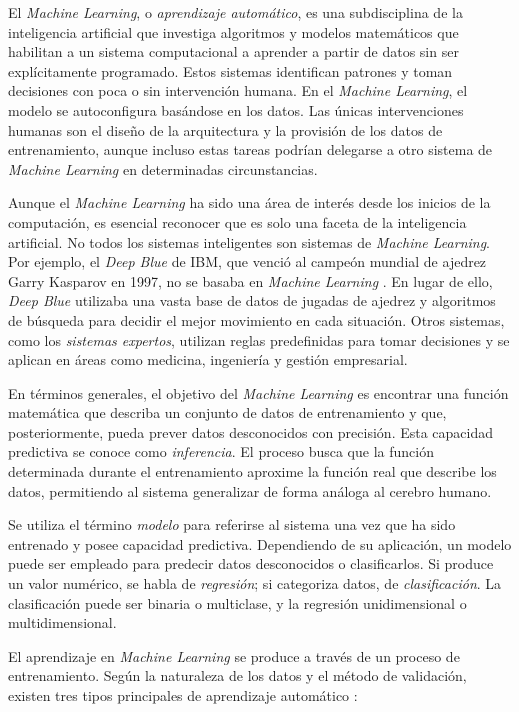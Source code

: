 El \textit{Machine Learning}, o \textit{aprendizaje automático}, es una subdisciplina de la inteligencia artificial que investiga algoritmos y modelos matemáticos que habilitan a un sistema computacional a aprender a partir de datos sin ser explícitamente programado. Estos sistemas identifican patrones y toman decisiones con poca o sin intervención humana. En el \textit{Machine Learning}, el modelo se autoconfigura basándose en los datos. Las únicas intervenciones humanas son el diseño de la arquitectura y la provisión de los datos de entrenamiento, aunque incluso estas tareas podrían delegarse a otro sistema de \textit{Machine Learning} en determinadas circunstancias.

Aunque el \textit{Machine Learning} ha sido una área de interés desde los inicios de la computación, es esencial reconocer que es solo una faceta de la inteligencia artificial. No todos los sistemas inteligentes son sistemas de \textit{Machine Learning}. Por ejemplo, el \textit{Deep Blue} de IBM, que venció al campeón mundial de ajedrez Garry Kasparov en 1997, no se basaba en \textit{Machine Learning} \citep{campbellDeepBlue2002}. En lugar de ello, \textit{Deep Blue} utilizaba una vasta base de datos de jugadas de ajedrez y algoritmos de búsqueda para decidir el mejor movimiento en cada situación. Otros sistemas, como los \emph{sistemas expertos}, utilizan reglas predefinidas para tomar decisiones y se aplican en áreas como medicina, ingeniería y gestión empresarial.

En términos generales, el objetivo del \textit{Machine Learning} es encontrar una función matemática que describa un conjunto de datos de entrenamiento y que, posteriormente, pueda prever datos desconocidos con precisión. Esta capacidad predictiva se conoce como \textit{inferencia}. El proceso busca que la función determinada durante el entrenamiento aproxime la función real que describe los datos, permitiendo al sistema generalizar de forma análoga al cerebro humano.

Se utiliza el término \textit{modelo} para referirse al sistema una vez que ha sido entrenado y posee capacidad predictiva. Dependiendo de su aplicación, un modelo puede ser empleado para predecir datos desconocidos o clasificarlos. Si produce un valor numérico, se habla de \textit{regresión}; si categoriza datos, de \textit{clasificación}. La clasificación puede ser binaria o multiclase, y la regresión unidimensional o multidimensional.

El aprendizaje en \textit{Machine Learning} se produce a través de un proceso de entrenamiento. Según la naturaleza de los datos y el método de validación, existen tres tipos principales de aprendizaje automático \citep[p. ~38]{torresivinalsPythonDeepLearning2020}:

